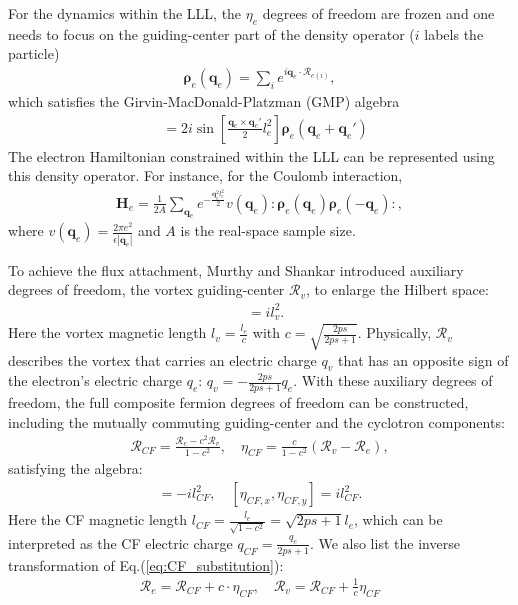 For the dynamics within the LLL, the $\eta_e$ degrees of freedom are frozen and one needs to focus on the guiding-center part of the density operator ($i$ labels the particle)
\begin{align}
    \pmb{\boldsymbol\rho}_e(\mathbf q_e)=\sum_{i}e^{i\mathbf q_e\cdot \mathcal R_{e(i)}},\label{eq:e_density}
\end{align}
which satisfies the Girvin-MacDonald-Platzman (GMP) algebra \cite{girvin1986magneto}
\begin{align}
    [\pmb{\boldsymbol\rho}_e(\mathbf q_e),\pmb{\boldsymbol\rho}_e(\mathbf q_e')] & =2i\sin\left[\frac{\mathbf q_e\times \mathbf q_e'}{2}l_e^2\right]\pmb{\boldsymbol\rho}_e(\mathbf q_e+\mathbf q_e')\label{eq:GMP}
\end{align}
The electron Hamiltonian constrained within the LLL can be represented using this density operator. For instance, for the Coulomb interaction,
\begin{align}
    \mathbf H_e=\frac{1}{2 A}\sum_{\mathbf q_e} e^{-\frac{\mathbf q_e^2l_e^2}{2}}v(\mathbf q_e):\pmb{\boldsymbol\rho}_e(\mathbf q_e)\pmb{\boldsymbol\rho}_e(-\mathbf q_e):,
\end{align}
where $v(\mathbf q_e)=\frac{2\pi e^2}{\epsilon |\mathbf q_e|}$ and $A$ is the real-space sample size.

To achieve the flux attachment, Murthy and Shankar introduced auxiliary degrees of freedom, the vortex guiding-center $\mathcal R_v$, to enlarge the Hilbert space:
\begin{align}
    [\mathcal R_{v,x},\mathcal R_{v,y}] & =il_v^2.\label{eq:v_guiding_center}
\end{align}
Here the vortex magnetic length $l_v=\frac{l_e}{c}$ with $c=\sqrt{\frac{2ps}{2ps+1}}$. Physically, $\mathcal R_v$ describes the vortex that carries an electric charge $q_v$ that has an opposite sign of the electron's electric charge $q_e$:  $q_v=-\frac{2ps}{2ps+1}q_e$. With these auxiliary degrees of freedom, the full composite fermion degrees of freedom can be constructed, including the mutually commuting guiding-center and the cyclotron components:
\begin{align}
    \mathcal R_{CF}=\frac{\mathcal R_e-c^2\mathcal R_v}{1-c^2}, \quad \eta_{CF}=\frac{c}{1-c^2}(\mathcal R_v-\mathcal R_e), \label{eq:CF_substitution}
\end{align}
satisfying the algebra:
\begin{align}
    [\mathcal R_{CF,x},\mathcal R_{CF,y}]=-il_{CF}^2, \quad [\eta_{CF,x},\eta_{CF,y}]=il_{CF}^2.\label{eq:CF_algebra}
\end{align}
Here the CF magnetic length $l_{CF}=\frac{l_e}{\sqrt{1-c^2}}=\sqrt{2ps+1}l_e$, which can be interpreted as the CF electric charge $q_{CF}=\frac{q_e}{2ps+1}$. We also list the inverse transformation of Eq.(\ref{eq:CF_substitution}):
\begin{align}
    \mathcal R_e=\mathcal R_{CF}+c\cdot\eta_{CF}, \quad \mathcal R_v=\mathcal R_{CF}+\frac{1}{c}\eta_{CF}\label{eq:CF_substitution_inverse}
\end{align}

